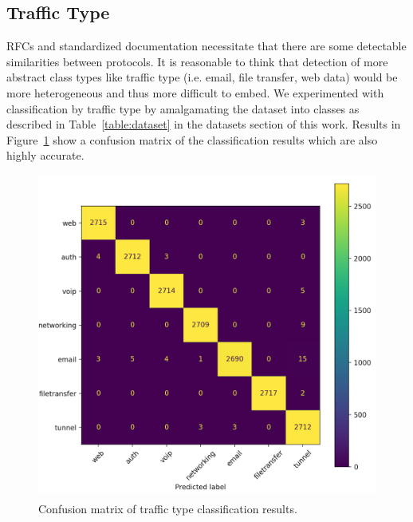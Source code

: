 \subsection{Traffic Type}

RFCs and standardized documentation necessitate that there are some detectable similarities between protocols. It is reasonable to think that detection of more abstract class types like traffic type (i.e. email, file transfer, web data) would be more heterogeneous and thus more difficult to embed. We experimented with classification by traffic type by amalgamating the dataset into classes as described in Table~\ref{table:dataset} in the datasets section of this work. Results in Figure~\ref{fig:trafficresults} show a confusion matrix of the classification results which are also highly accurate.

\begin{figure} [hbt!]
  \centering
  \includegraphics[width=0.8\columnwidth]{chapters/4/img/traffic_class_results.png}
  \caption{Confusion matrix of traffic type classification results.}
  \label{fig:trafficresults}
\end{figure}

